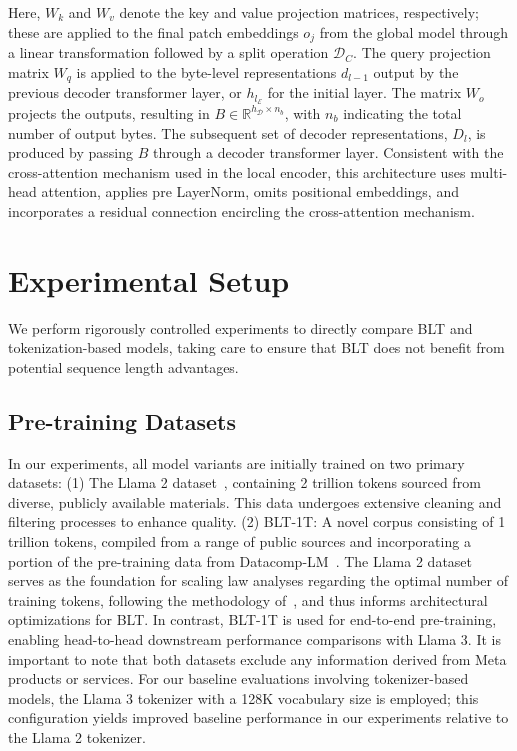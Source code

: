 Here, $W_k$ and $W_v$ denote the key and value projection matrices, respectively; these are applied to the final patch embeddings $o_j$ from the global model through a linear transformation followed by a split operation $\mathcal{D}_C$. The query projection matrix $W_q$ is applied to the byte-level representations $d_{l-1}$ output by the previous decoder transformer layer, or $h_{l_{\mathcal{E}}}$ for the initial layer. The matrix $W_o$ projects the outputs, resulting in $B \in \mathbb{R}^{h_{\mathcal{D}} \times n_b}$, with $n_b$ indicating the total number of output bytes. The subsequent set of decoder representations, $D_l$, is produced by passing $B$ through a decoder transformer layer. Consistent with the cross-attention mechanism used in the local encoder, this architecture uses multi-head attention, applies pre LayerNorm, omits positional embeddings, and incorporates a residual connection encircling the cross-attention mechanism.

\section{Experimental Setup}
\label{section:experiments}
We perform rigorously controlled experiments to directly compare {\textsc BLT} and tokenization-based models, taking care to ensure that {\textsc BLT} does not benefit from potential sequence length advantages.

\subsection{Pre-training Datasets} In our experiments, all model variants are initially trained on two primary datasets: (1) The Llama 2 dataset~\citep{touvron2023llama}, containing 2 trillion tokens sourced from diverse, publicly available materials. This data undergoes extensive cleaning and filtering processes to enhance quality. (2) {\textsc BLT}-1T: A novel corpus consisting of 1 trillion tokens, compiled from a range of public sources and incorporating a portion of the pre-training data from Datacomp-LM~\citep{li2024datacomp}. The Llama 2 dataset serves as the foundation for scaling law analyses regarding the optimal number of training tokens, following the methodology of~\cite{dubey2024llama}, and thus informs architectural optimizations for {\textsc BLT}. In contrast, {\textsc BLT}-1T is used for end-to-end pre-training, enabling head-to-head downstream performance comparisons with Llama 3. It is important to note that both datasets exclude any information derived from Meta products or services. For our baseline evaluations involving tokenizer-based models, the Llama 3 tokenizer with a 128K vocabulary size is employed; this configuration yields improved baseline performance in our experiments relative to the Llama 2 tokenizer.

